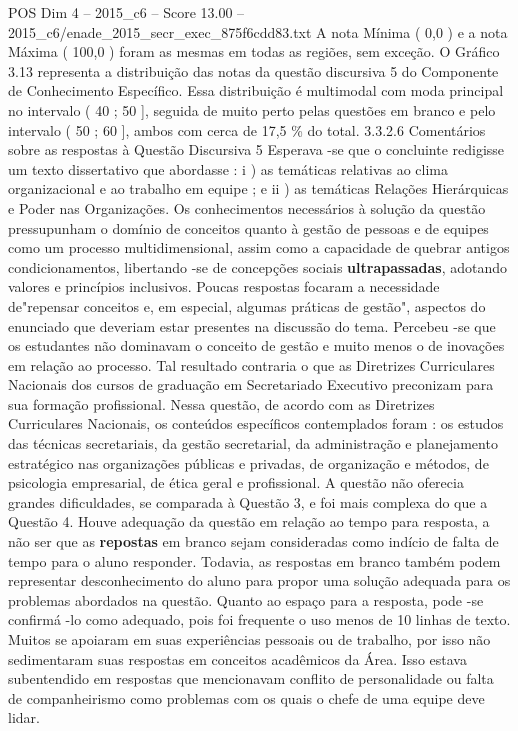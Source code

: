 \begin{textsample}{POS Dim 4 – 2015\_c6 – Score 13.00 – 2015\_c6/enade\_2015\_secr\_exec\_875f6cdd83.txt}
A nota Mínima ( 0,0 ) e a nota Máxima ( 100,0 ) foram as mesmas em todas as regiões, sem exceção.
O Gráfico 3.13 representa a distribuição das notas da questão discursiva 5 do Componente de Conhecimento Específico.
Essa distribuição é multimodal com moda principal no intervalo ( 40 ; 50 ], seguida de muito perto pelas questões em branco e pelo intervalo ( 50 ; 60 ], ambos com cerca de 17,5 \% do total. 3.3.2.6 Comentários sobre as respostas à Questão Discursiva 5 Esperava -se que o concluinte redigisse um texto dissertativo que abordasse : i ) as temáticas relativas ao clima organizacional e ao trabalho em equipe ; e ii ) as temáticas Relações Hierárquicas e Poder nas Organizações.
Os conhecimentos necessários à solução da questão pressupunham o domínio de conceitos quanto à gestão de pessoas e de equipes como um processo multidimensional, assim como a capacidade de quebrar antigos condicionamentos, libertando -se de concepções sociais \textbf{ultrapassadas}, adotando valores e princípios inclusivos.
Poucas respostas focaram a necessidade de"repensar conceitos e, em especial, algumas práticas de gestão", aspectos do enunciado que deveriam estar presentes na discussão do tema.
Percebeu -se que os estudantes não dominavam o conceito de gestão e muito menos o de inovações em relação ao processo.
Tal resultado contraria o que as Diretrizes Curriculares Nacionais dos cursos de graduação em Secretariado Executivo preconizam para sua formação profissional.
Nessa questão, de acordo com as Diretrizes Curriculares Nacionais, os conteúdos específicos contemplados foram : os estudos das técnicas secretariais, da gestão secretarial, da administração e planejamento estratégico nas organizações públicas e privadas, de organização e métodos, de psicologia empresarial, de ética geral e profissional.
A questão não oferecia grandes dificuldades, se comparada à Questão 3, e foi mais complexa do que a Questão 4.
Houve adequação da questão em relação ao tempo para resposta, a não ser que as \textbf{repostas} em branco sejam consideradas como indício de falta de tempo para o aluno responder.
Todavia, as respostas em branco também podem representar desconhecimento do aluno para propor uma solução adequada para os problemas abordados na questão.
Quanto ao espaço para a resposta, pode -se confirmá -lo como adequado, pois foi frequente o uso menos de 10 linhas de texto.
Muitos se apoiaram em suas experiências pessoais ou de trabalho, por isso não sedimentaram suas respostas em conceitos acadêmicos da Área.
Isso estava subentendido em respostas que mencionavam conflito de personalidade ou falta de companheirismo como problemas com os quais o chefe de uma equipe deve lidar.

\end{textsample}
